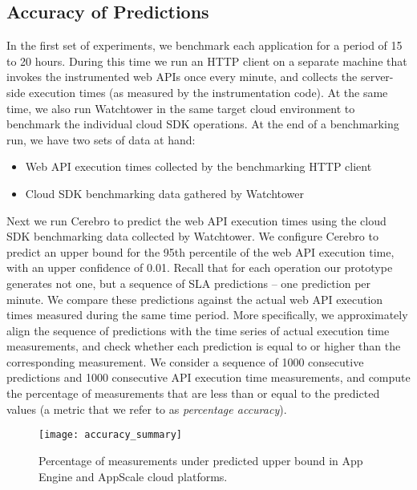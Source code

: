 \subsection{Accuracy of Predictions}
In the first set of experiments, we benchmark each application for a period of 15 to 20 hours.
During this time we run an HTTP client on a separate machine that invokes the instrumented web APIs once every minute, 
and collects the server-side execution times (as measured by the instrumentation code).
At the same time, we also run Watchtower in the same target cloud environment to
benchmark the individual cloud SDK operations. 
At the end of a benchmarking run, we have two sets of data at hand:

\begin{itemize}
\item Web API execution times collected by the benchmarking HTTP client
\item Cloud SDK benchmarking data gathered by Watchtower
\end{itemize}

Next we run Cerebro to predict the web API execution times using the cloud SDK benchmarking data
collected by Watchtower. We configure Cerebro to predict an upper bound for the 95th percentile of the web API
execution time, with an upper confidence of 0.01. Recall that for each operation our prototype generates not one, 
but a sequence of SLA predictions -- one prediction per minute. 
We compare these predictions against the actual web API execution times measured during the same
time period. More specifically, we approximately align the sequence of predictions with the time series of actual execution
time measurements, and check whether each prediction is equal to or higher than the corresponding measurement. We consider a 
sequence of 1000 consecutive predictions and 1000 consecutive API execution
time measurements, and compute the percentage of measurements that are less than or equal to the predicted values (a
metric that we refer to as \textit{percentage accuracy}).

\begin{figure}
\centering
\texttt{[image: accuracy\_summary]}
\caption{Percentage of measurements under predicted upper bound in App Engine and AppScale cloud platforms.}
\label{fig:accuracy_summary}
\end{figure}

